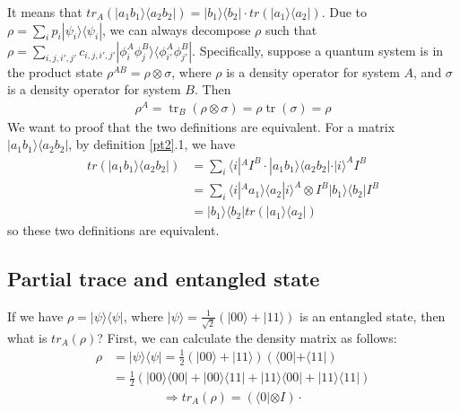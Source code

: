 \documentclass[UTF8,12pt]{article} %
\begin{document}
It means that $tr_{A}(|a_{1}b_{1}\rangle\langle a_{2}b_{2}|) = |b_{1}\rangle\langle b_{2}| \cdot tr(|a_{1}\rangle\langle a_{2}|)$. Due to $\rho = \sum_{i}p_{i}|\psi_{i}\rangle\langle\psi_{i}|$, we can always decompose $\rho$ such that $\rho = \sum_{i,j,i',j'} c_{i,j,i',j'} |\phi_{i}^{A} \phi_{j}^{B}\rangle\langle\phi_{i'}^{A} \phi_{j'}^{B}|$. Specifically, suppose a quantum system is in the product state $\rho^{AB} = \rho \otimes \sigma$, where $\rho$ is a density operator for system $A$, and $\sigma$ is a density operator for system $B$. Then
\begin{align}
\rho^{A}=\operatorname{tr}_{B}(\rho \otimes \sigma)=\rho \operatorname{tr}(\sigma)=\rho
\end{align}
We want to proof that the two definitions are equivalent. For a matrix $|a_{1}b_{1}\rangle\langle a_{2}b_{2}|$, by definition \ref{pt2}.1, we have
\begin{align}
tr(|a_{1}b_{1}\rangle\langle a_{2}b_{2}|) &= \sum_{i} \langle i|^{A} I^{B}\cdot |a_{1}b_{1}\rangle\langle a_{2}b_{2}| \cdot |i\rangle^{A} I^{B} \\
&= \sum_{i} \langle i|^{A}a_{1}\rangle\langle a_{2}|i\rangle^{A} \otimes I^{B} |b_{1}\rangle\langle b_{2}| I^{B}\\
&= |b_{1}\rangle\langle b_{2}|tr(|a_{1}\rangle\langle a_{2}|)
\end{align}
so these two definitions are equivalent.

\subsection{Partial trace and entangled state}

If we have $\rho = |\psi\rangle\langle\psi|$, where $|\psi\rangle = \frac{1}{\sqrt{2}}(|00\rangle + |11\rangle)$ is an entangled state, then what is $tr_{A}(\rho)$? First, we can calculate the density matrix as follows:
\begin{align}
\rho &= |\psi\rangle\langle\psi| = \frac{1}{2}(|00\rangle + |11\rangle)(\langle 00| + \langle 11|) \\
&= \frac{1}{2}(|00\rangle\langle00| + |00\rangle\langle11| + |11\rangle\langle00| + |11\rangle\langle11|)
\end{align}
\begin{align}
\Rightarrow tr_{A}(\rho) = (\langle0|\otimes I) \cdot 
\end{align}
\end{document}
